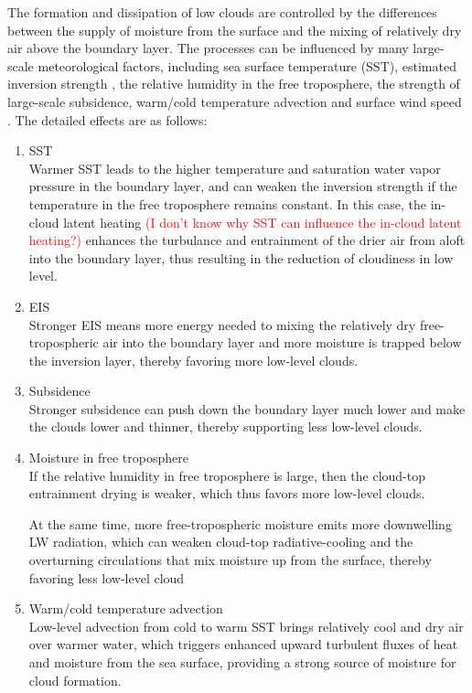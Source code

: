 The formation and dissipation of low clouds are controlled by the differences between the supply of moisture from the surface and the mixing of relatively dry air above the boundary layer. The processes can be influenced by many large-scale meteorological factors, including sea surface temperature (SST), estimated inversion strength \citep[EIS;][]{Wood2006}, the relative humidity in the free troposphere, the strength of large-scale subsidence, warm/cold temperature advection and surface wind speed \citep{Scott2020}. The detailed effects are as follows:

\begin{enumerate}[label={(\arabic*)}]
    \item SST \\
    Warmer SST leads to the higher temperature and saturation water vapor pressure in the boundary layer, and can weaken the inversion strength if the temperature in the free troposphere remains constant. In this case, the in-cloud latent heating 
    \textcolor{red}{(I don't know why SST can influence the in-cloud latent heating?)} enhances the turbulance and entrainment of the drier air from aloft into the boundary layer, thus resulting in the reduction of cloudiness in low level.
    
    \item EIS \\
    Stronger EIS means more energy needed to mixing the relatively dry free-tropospheric air into the boundary layer and more moisture is trapped below the inversion layer, thereby favoring more low-level clouds.
    
    \item Subsidence \\
    Stronger subsidence can push down the boundary layer much lower and make the clouds lower and thinner, thereby supporting less low-level clouds.
    
    \item Moisture in free troposphere \\
    If the relative humidity in free troposphere is large, then the cloud-top entrainment drying is weaker, which thus favors more low-level clouds.
    
    
    At the same time, more free-tropospheric moisture emits more downwelling LW radiation, which can weaken cloud-top radiative-cooling and the overturning circulations that mix moisture up from the surface, thereby favoring less low-level cloud
    
    
    \item Warm/cold temperature advection\\
    Low-level advection from cold to warm SST brings relatively cool and dry air over warmer water, which triggers enhanced upward turbulent fluxes of heat and moisture from the sea surface, providing a strong source of moisture for cloud formation.
    

\end{enumerate}
